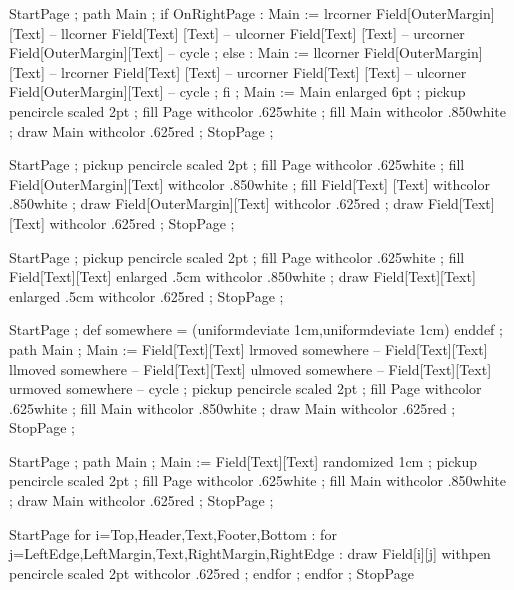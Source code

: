 \startbuffer[back-1]
  StartPage ;
    path Main ;
    if OnRightPage :
      Main := lrcorner Field[OuterMargin][Text] --
              llcorner Field[Text]       [Text] --
              ulcorner Field[Text]       [Text] --
              urcorner Field[OuterMargin][Text] -- cycle ;
    else :
      Main := llcorner Field[OuterMargin][Text] --
              lrcorner Field[Text]       [Text] --
              urcorner Field[Text]       [Text] --
              ulcorner Field[OuterMargin][Text] -- cycle ;
    fi ;
    Main := Main enlarged 6pt ;
    pickup pencircle scaled 2pt ;
    fill Page withcolor .625white ;
    fill Main withcolor .850white ;
    draw Main withcolor .625red ;
  StopPage ;
\stopuseMPgraphic
\stopbuffer

\startbuffer[back-2]
  StartPage ;
    pickup pencircle scaled 2pt ;
    fill Page                     withcolor .625white ;
    fill Field[OuterMargin][Text] withcolor .850white ;
    fill Field[Text]       [Text] withcolor .850white ;
    draw Field[OuterMargin][Text] withcolor .625red ;
    draw Field[Text]       [Text] withcolor .625red ;
  StopPage ;
\stopuseMPgraphic
\stopbuffer

\startbuffer[back-3]
  StartPage ;
    pickup pencircle scaled 2pt ;
    fill Page                            withcolor .625white ;
    fill Field[Text][Text] enlarged .5cm withcolor .850white ;
    draw Field[Text][Text] enlarged .5cm withcolor .625red ;
  StopPage ;
\stopuseMPgraphic
\stopbuffer

\startbuffer[back-4]
  StartPage ;
    def somewhere =
      (uniformdeviate 1cm,uniformdeviate 1cm)
    enddef ;
    path Main ;
    Main := Field[Text][Text] lrmoved somewhere --
            Field[Text][Text] llmoved somewhere --
            Field[Text][Text] ulmoved somewhere --
            Field[Text][Text] urmoved somewhere -- cycle ;
    pickup pencircle scaled 2pt ;
    fill Page withcolor .625white ;
    fill Main withcolor .850white ;
    draw Main withcolor .625red ;
  StopPage ;
\stopuseMPgraphic
\stopbuffer

\startbuffer[back-4x]
  StartPage ;
    path Main ; Main := Field[Text][Text] randomized 1cm ;
    pickup pencircle scaled 2pt ;
    fill Page withcolor .625white ;
    fill Main withcolor .850white ;
    draw Main withcolor .625red ;
  StopPage ;
\stopuseMPgraphic
\stopbuffer

\startbuffer[back-5]
  StartPage
    for i=Top,Header,Text,Footer,Bottom :
      for j=LeftEdge,LeftMargin,Text,RightMargin,RightEdge :
        draw Field[i][j] withpen pencircle scaled 2pt withcolor .625red ;
      endfor ;
    endfor ;
  StopPage
\stopuseMPgraphic
\stopbuffer

